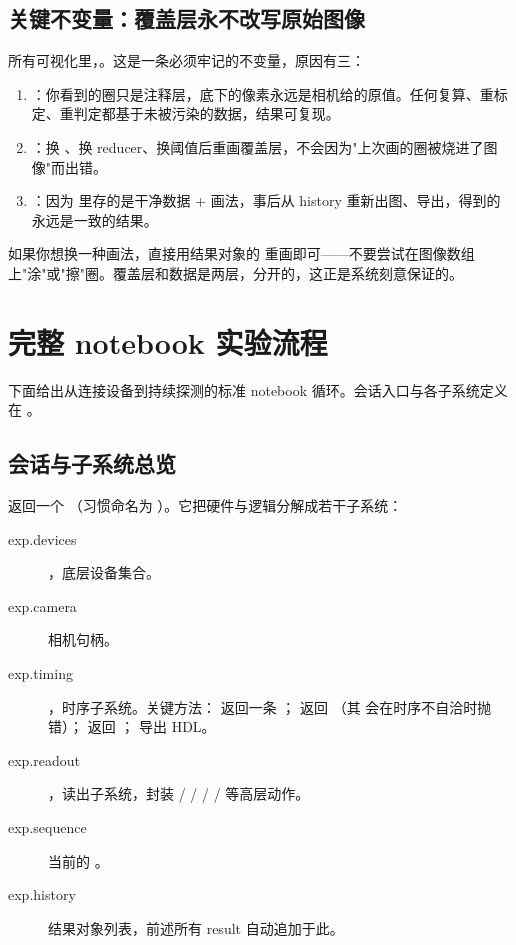 \documentclass[11pt,oneside,openany]{book}
\begin{document}
\subsection{关键不变量：覆盖层永不改写原始图像}

所有可视化里，。这是一条必须牢记的不变量，原因有三：

\begin{enumerate}
\item {}：你看到的圈只是注释层，底下的像素永远是相机给的原值。任何复算、重标定、重判定都基于未被污染的数据，结果可复现。
\item {}：换 、换 reducer、换阈值后重画覆盖层，不会因为"上次画的圈被烧进了图像"而出错。
\item {}：因为  里存的是干净数据 + 画法，事后从 history 重新出图、导出，得到的永远是一致的结果。
\end{enumerate}

\begin{notebox}[别去"擦掉"覆盖层]
如果你想换一种画法，直接用结果对象的  重画即可——不要尝试在图像数组上"涂"或"擦"圈。覆盖层和数据是两层，分开的，这正是系统刻意保证的。
\end{notebox}

\section{完整 notebook 实验流程}

下面给出从连接设备到持续探测的标准 notebook 循环。会话入口与各子系统定义在 。

\subsection{会话与子系统总览}

 返回一个 （习惯命名为 ）。它把硬件与逻辑分解成若干子系统：

\begin{description}
\item[exp.devices] ，底层设备集合。
\item[exp.camera] 相机句柄。
\item[exp.timing] ，时序子系统。关键方法： 返回一条 ； 返回 （其  会在时序不自洽时抛错）； 返回 ； 导出 HDL。
\item[exp.readout] ，读出子系统，封装  /  /  /  /  等高层动作。
\item[exp.sequence] 当前的 。
\item[exp.history] 结果对象列表，前述所有 result 自动追加于此。
\end{description}
\end{document}
